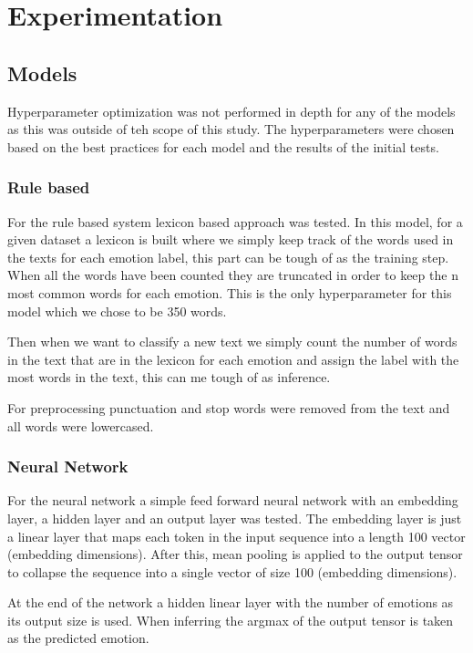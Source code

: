 \chapter{Experimentation}\label{chapter:chapter02}

\section{Models}
Hyperparameter optimization was not performed in depth for any of the models as
this was outside of teh scope of this study. The hyperparameters were chosen
based on the best practices for each model and the results of the initial
tests.

\subsection{Rule based}

For the rule based system lexicon based approach was tested. In this model, for
a given dataset a lexicon is built where we simply keep track of the words used
in the texts for each emotion label, this part can be tough of as the training
step. When all the words have been counted they are truncated in order to keep
the
n most common words for each emotion. This is the only hyperparameter for this
model which we chose to be 350 words.

Then when we want to classify a new text we simply count the number of
words in the text that are in the lexicon for each emotion and assign the label
with the most words in the text, this can me tough of as inference.

For preprocessing punctuation and stop words were removed from the text and all
words were lowercased.

\subsection{Neural Network}

For the neural network a simple feed forward neural network with an
embedding layer, a hidden layer and an output layer was tested. The embedding
layer is
just a linear layer that maps each token in the input sequence
into a length 100 vector (embedding dimensions). After this, mean pooling is
applied to the output tensor to collapse the sequence into a single vector of
size 100 (embedding dimensions).

At the end of the network a hidden linear layer with the number of
emotions as its output size is used. When inferring the argmax of the output
tensor is
taken as the predicted emotion.

